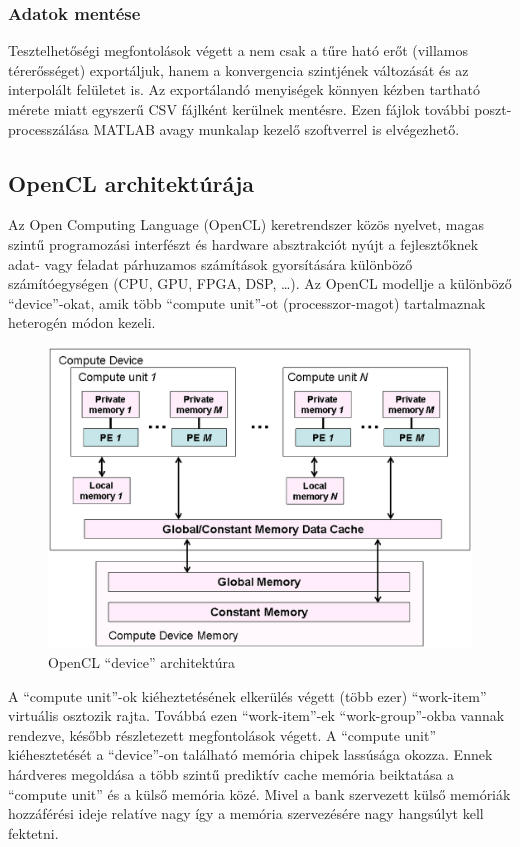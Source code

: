 		\subsubsection{Adatok mentése}
		Tesztelhetőségi megfontolások végett a nem csak a tűre ható erőt (villamos
		térerősséget) exportáljuk, hanem a konvergencia szintjének változását és az
		interpolált felületet is. Az exportálandó menyiségek könnyen kézben tartható
		mérete miatt egyszerű CSV fájlként kerülnek mentésre. Ezen fájlok további
		poszt-processzálása MATLAB avagy munkalap kezelő szoftverrel is elvégezhető.
		
	
	\subsection{OpenCL architektúrája}
		Az Open Computing Language (OpenCL) keretrendszer \cite{Web:khronos} közös
		nyelvet, magas szintű programozási interfészt és hardware absztrakciót nyújt a fejlesztőknek
		adat- vagy feladat párhuzamos számítások gyorsítására különböző
		számítóegységen (CPU, GPU, FPGA, DSP, \ldots).
		Az OpenCL modellje a különböző ``device''-okat, amik több ``compute unit''-ot
		(processzor-magot) tartalmaznak heterogén módon kezeli. 
		
		\begin{figure}[!ht]
			\centering
			\includegraphics[width=0.95\columnwidth]{kepek/opencl_device.eps}
			\caption{OpenCL ``device'' architektúra \cite{Web:khronos}} 
			\label{fig:device} 
		\end{figure}
		
		A ``compute unit''-ok kiéheztetésének elkerülés végett (több ezer)
		``work-item'' virtuális osztozik rajta.
		Továbbá ezen ``work-item''-ek ``work-group''-okba vannak rendezve, később
		részletezett megfontolások végett.
		A ``compute unit'' kiéhesztetését a ``device''-on található memória chipek lassúsága okozza.
		Ennek hárdveres megoldása a több szintű prediktív cache memória beiktatása a
		``compute unit'' és a külső memória közé.
		Mivel a bank szervezett külső memóriák hozzáférési ideje relatíve nagy
		így a memória szervezésére nagy hangsúlyt kell fektetni.
		
